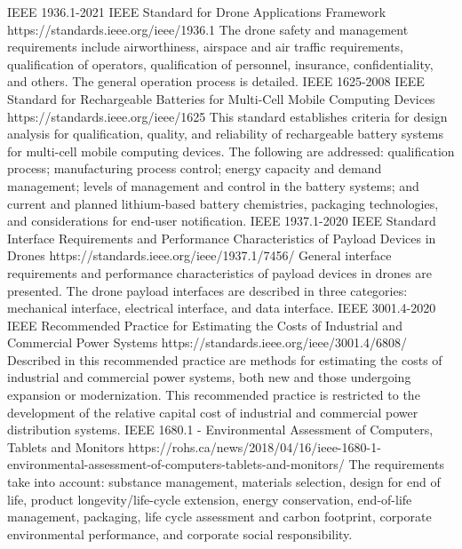 \documentclass[12pt]{article}
\begin{document}
            \ieeestd
            {IEEE 1936.1-2021 IEEE Standard for Drone Applications Framework}
            {https://standards.ieee.org/ieee/1936.1}
            {The drone safety and management requirements include airworthiness, airspace and air traffic requirements, qualification of operators, qualification of personnel, insurance, confidentiality, and others. The general operation process is detailed.}
            \ieeestd
            {IEEE 1625-2008 IEEE Standard for Rechargeable Batteries for Multi-Cell Mobile Computing Devices}
            {https://standards.ieee.org/ieee/1625}
            {This standard establishes criteria for design analysis for qualification, quality, and reliability of rechargeable battery systems for multi-cell mobile computing devices. The following are addressed: qualification process; manufacturing process control; energy capacity and demand management; levels of management and control in the battery systems; and current and planned lithium-based battery chemistries, packaging technologies, and considerations for end-user notification.}
            \ieeestd
            {IEEE 1937.1-2020 IEEE Standard Interface Requirements and Performance Characteristics of Payload Devices in Drones}
            {https://standards.ieee.org/ieee/1937.1/7456/}
            {General interface requirements and performance characteristics of payload devices in drones are presented. The drone payload interfaces are described in three categories: mechanical interface, electrical interface, and data interface.}
            \ieeestd
            {IEEE 3001.4-2020 IEEE Recommended Practice for Estimating the Costs of Industrial and Commercial Power Systems}
            {https://standards.ieee.org/ieee/3001.4/6808/}
            {Described in this recommended practice are methods for estimating the costs of industrial and commercial power systems, both new and those undergoing expansion or modernization. This recommended practice is restricted to the development of the relative capital cost of industrial and commercial power distribution systems.}
            \ieeestd
            {IEEE 1680.1 - Environmental Assessment of Computers, Tablets and Monitors}
            {https://rohs.ca/news/2018/04/16/ieee-1680-1-environmental-assessment-of-computers-tablets-and-monitors/}
            {The requirements take into account: substance management, materials selection, design for end of life, product longevity/life-cycle extension, energy conservation, end-of-life management, packaging, life cycle assessment and carbon footprint, corporate environmental performance, and corporate social responsibility.}
        
\end{document}

